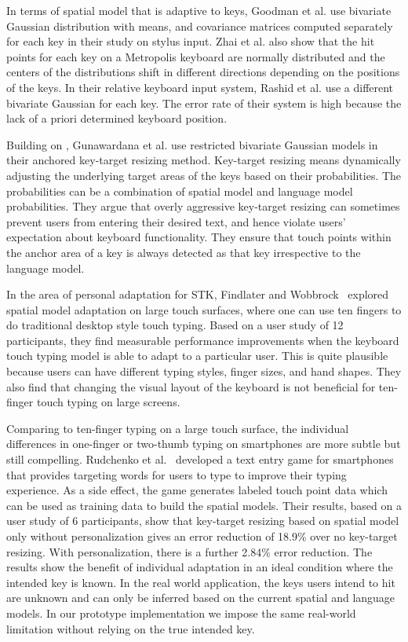 \documentclass{sigchi}
\begin{document}
In terms of spatial model that is adaptive to keys, Goodman et al. \cite{Goodman:2002} use bivariate Gaussian distribution with means, and
covariance matrices computed separately for each key in their study on stylus input. Zhai et al. \cite{Zhai:2002} also show that
the hit points for each key on a Metropolis keyboard \cite{Zhai:2000} are normally distributed and 
the centers of the distributions shift in different directions depending on the positions of
the keys. In their relative keyboard input system, Rashid et al. \cite{Rashid:2008} use a different bivariate Gaussian for each key. The error rate of their system is high because the lack of 
a priori determined keyboard position.

Building on \cite{Goodman:2002}, Gunawardana et al. \cite{Gunawardana:2010} use restricted bivariate Gaussian
models in their anchored key-target resizing method. Key-target resizing means dynamically
adjusting the underlying target areas of the keys based on their probabilities. The probabilities can 
be a combination of spatial model and language model probabilities.
They argue that overly aggressive
key-target resizing can sometimes prevent users from entering their desired text, and hence violate
users' expectation about keyboard functionality. They ensure that touch points within
the anchor area of a key is always detected as that key irrespective to the language model.

In the area of personal adaptation for STK, Findlater and
Wobbrock~\cite{Findlater:2012} explored spatial model adaptation on large touch 
surfaces, where one can use ten fingers to do traditional desktop style touch 
typing. Based on a user study of 12 participants, they find measurable
performance improvements when the keyboard touch typing model is able to adapt to a particular user. This is quite plausible because users can have different typing styles, finger sizes, and hand shapes. They also find that changing the visual layout of the keyboard is not beneficial for ten-finger touch typing on large screens.

Comparing to ten-finger typing on a large touch surface, the individual 
differences in one-finger or two-thumb typing on smartphones are more subtle but
still compelling. Rudchenko et al.~\cite{Rudchenko:2011} developed a text entry 
game for smartphones that provides targeting words for users to type to improve 
their typing experience. As a side effect, the game generates labeled touch 
point data which can be used as training data to build the spatial models.
Their results, based on a user study of 6 participants, show that key-target
resizing based on spatial model only without personalization gives an error 
reduction of 18.9\% over no key-target resizing.
With personalization, there is a further 2.84\% error reduction.
The results show the benefit of individual adaptation in an ideal condition
where the intended key is known. In the real world application, the keys users 
intend to hit are unknown and can only be inferred based on the current spatial 
and language models. In our prototype implementation we impose 
the same real-world limitation without relying on the true intended key.
\end{document}
